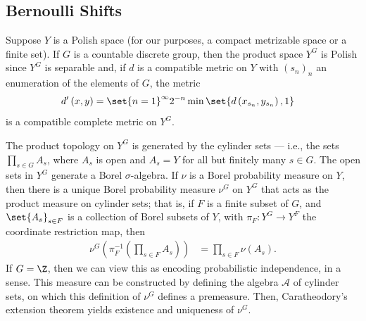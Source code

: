 \documentclass[10pt]{mypackage}
\begin{document}
\subsection{Bernoulli Shifts}%
Suppose $Y$ is a Polish space (for our purposes, a compact metrizable space or a finite set). If $G$ is a countable discrete group, then the product space $Y^G$ is Polish since $Y^G$ is separable and, if $d$ is a compatible metric on $Y$ with $\left( s_n \right)_n$ an enumeration of the elements of $G$, the metric
\begin{align*}
  d'\left( x,y \right) &= \set{n=1}^{\infty}2^{-n}\min\set{d\left( x_{s_n},y_{s_n} \right),1}
\end{align*}
is a compatible complete metric on $Y^G$.

The product topology on $Y^{G}$ is generated by the cylinder sets --- i.e., the sets $\prod_{s\in G}A_s$, where $A_s$ is open and $A_s = Y$ for all but finitely many $s\in G$. The open sets in $Y^G$ generate a Borel $\sigma$-algebra. If $\nu$ is a Borel probability measure on $Y$, then there is a unique Borel probability measure $\nu^G$ on $Y^G$ that acts as the product measure on cylinder sets; that is, if $F$ is a finite subset of $G$, and $\set{A_s}_{s\in F}$ is a collection of Borel subsets of $Y$, with $\pi_F\colon Y^G\rightarrow Y^F$ the coordinate restriction map, then
\begin{align*}
  \nu^G\left( \pi_{F}^{-1}\left( \prod_{s\in F}A_s \right) \right) &= \prod_{s\in F} \nu\left( A_s \right).
\end{align*}
If $G = \Z$, then we can view this as encoding probabilistic independence, in a sense. This measure can be constructed by defining the algebra $\mathcal{A}$ of cylinder sets, on which this definition of $\nu^{G}$ defines a premeasure. Then, Caratheodory's extension theorem yields existence and uniqueness of $\nu^{G}$.
\end{document}
